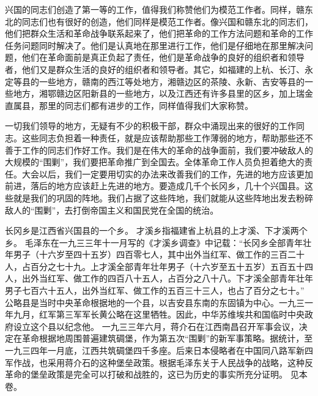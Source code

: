兴国的同志们创造了第一等的工作，值得我们称赞他们为模范工作者。同样，赣东北的同志们也有很好的创造，他们同样是模范工作者。像兴国和赣东北的同志们，他们把群众生活和革命战争联系起来了，他们把革命的工作方法问题和革命的工作任务问题同时解决了。他们是认真地在那里进行工作，他们是仔细地在那里解决问题，他们在革命面前是真正负起了责任，他们是革命战争的良好的组织者和领导者，他们又是群众生活的良好的组织者和领导者。其它，如福建的上杭、长汀、永定等县的一些地方，赣南的西江等处地方，湘赣边区的茶陵、永新、吉安等县的一些地方，湘鄂赣边区阳新县的一些地方，以及江西还有许多县里的区乡，加上瑞金直属县，那里的同志们都有进步的工作，同样值得我们大家称赞。

一切我们领导的地方，无疑有不少的积极干部，群众中涌现出来的很好的工作同志。这些同志负担着一种责任，就是应该帮助那些工作薄弱的地方，帮助那些还不善于工作的同志们作好工作。我们是在伟大的革命的战争面前，我们要冲破敌人的大规模的“围剿”，我们要把革命推广到全国去。全体革命工作人员负担着绝大的责任。大会以后，我们一定要用切实的办法来改善我们的工作，先进的地方应该更加前进，落后的地方应该赶上先进的地方。要造成几千个长冈乡，几十个兴国县。这些就是我们的巩固的阵地。我们占据了这些阵地，我们就能从这些阵地出发去粉碎敌人的“围剿”，去打倒帝国主义和国民党在全国的统治。


\begin{maonote}
长冈乡是江西省兴国县的一个乡。
才溪乡指福建省上杭县的上才溪、下才溪两个乡。
毛泽东在一九三三年十一月写的《才溪乡调查》中记载：“长冈乡全部青年壮年男子（十六岁至四十五岁）四百零七人，其中出外当红军、做工作的三百二十人，占百分之七十九。上才溪全部青年壮年男子（十六岁至五十五岁）五百五十四人，出外当红军、做工作的四百八十五人，占百分之八十八。下才溪全部青年壮年男子七百六十五人，出外当红军、做工作的五百三十三人，也占了百分之七十。”
公略县是当时中央革命根据地的一个县，以吉安县东南的东固镇为中心。一九三一年九月，红军第三军军长黄公略在这里牺牲。因此，中华苏维埃共和国临时中央政府设立这个县以纪念他。
一九三三年六月，蒋介石在江西南昌召开军事会议，决定在革命根据地周围普遍建筑碉堡，作为第五次“围剿”的新军事策略。据统计，至一九三四年一月底，江西共筑碉堡四千多座。后来日本侵略者在中国同八路军新四军作战，也采用蒋介石的这种堡垒政策。根据毛泽东关于人民战争的战略，这种反革命的堡垒政策是完全可以打破和战胜的，这已为历史的事实所充分证明。
见本卷。
\end{maonote}
